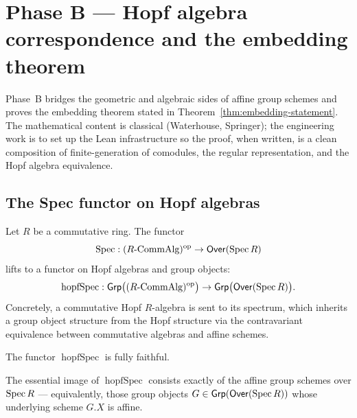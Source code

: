 \chapter{Phase B --- Hopf algebra correspondence and the embedding theorem}

Phase~B bridges the geometric and algebraic sides of affine group schemes
and proves the embedding theorem stated in
Theorem~\ref{thm:embedding-statement}. The mathematical content is
classical (Waterhouse, Springer); the engineering work is to set up the
Lean infrastructure so the proof, when written, is a clean composition
of finite-generation of comodules, the regular representation, and the
Hopf algebra equivalence.

\section{The Spec functor on Hopf algebras}

\begin{definition}\label{def:hopf-spec}
Let $R$ be a commutative ring. The functor
\[
  \operatorname{Spec} : (R\text{-CommAlg})^{\mathrm{op}} \to \mathsf{Over}(\operatorname{Spec} R)
\]
lifts to a functor on Hopf algebras and group objects:
\[
  \operatorname{hopfSpec} : \mathsf{Grp}\bigl((R\text{-CommAlg})^{\mathrm{op}}\bigr) \to \mathsf{Grp}\bigl(\mathsf{Over}(\operatorname{Spec} R)\bigr).
\]
Concretely, a commutative Hopf $R$-algebra is sent to its spectrum, which
inherits a group object structure from the Hopf structure via the
contravariant equivalence between commutative algebras and affine schemes.
\end{definition}

\begin{theorem}
  \label{thm:hopf-spec-fully-faithful}
The functor $\operatorname{hopfSpec}$ is fully faithful.
\end{theorem}

\begin{theorem}\label{thm:hopf-spec-ess-image}
The essential image of $\operatorname{hopfSpec}$ consists exactly of the
affine group schemes over $\operatorname{Spec} R$ --- equivalently, those group objects
$G \in \mathsf{Grp}(\mathsf{Over}(\operatorname{Spec} R))$ whose underlying scheme
$G.X$ is affine.
\end{theorem}

